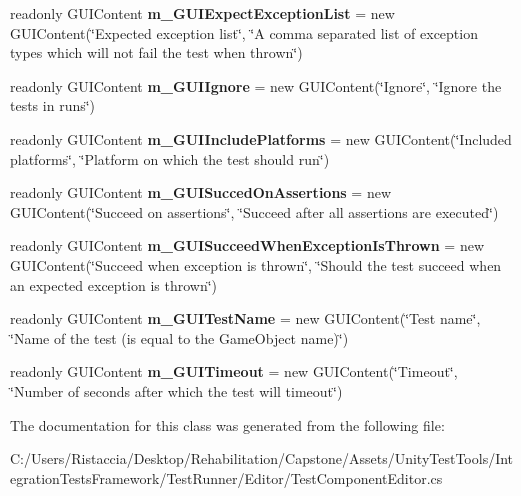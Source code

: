 \begin{DoxyCompactItemize}
readonly G\+U\+I\+Content {\bfseries m\+\_\+\+G\+U\+I\+Expect\+Exception\+List} = new G\+U\+I\+Content(\char`\"{}Expected exception list\char`\"{}, \char`\"{}A comma separated list of exception types which will not fail the test when thrown\char`\"{})
\item 
\mbox{\label{class_unity_test_1_1_test_component_editor_a491ac34f5ba2300e6ec15e26425969a0}} 
readonly G\+U\+I\+Content {\bfseries m\+\_\+\+G\+U\+I\+Ignore} = new G\+U\+I\+Content(\char`\"{}Ignore\char`\"{}, \char`\"{}Ignore the tests in runs\char`\"{})
\item 
\mbox{\label{class_unity_test_1_1_test_component_editor_acf6cb71d05de085b8d24bdcb6ae945e5}} 
readonly G\+U\+I\+Content {\bfseries m\+\_\+\+G\+U\+I\+Include\+Platforms} = new G\+U\+I\+Content(\char`\"{}Included platforms\char`\"{}, \char`\"{}Platform on which the test should run\char`\"{})
\item 
\mbox{\label{class_unity_test_1_1_test_component_editor_a0f4eef4ce52929808813ed35e033abdf}} 
readonly G\+U\+I\+Content {\bfseries m\+\_\+\+G\+U\+I\+Succed\+On\+Assertions} = new G\+U\+I\+Content(\char`\"{}Succeed on assertions\char`\"{}, \char`\"{}Succeed after all assertions are executed\char`\"{})
\item 
\mbox{\label{class_unity_test_1_1_test_component_editor_ad49a950f9613496e1433d6ade680a653}} 
readonly G\+U\+I\+Content {\bfseries m\+\_\+\+G\+U\+I\+Succeed\+When\+Exception\+Is\+Thrown} = new G\+U\+I\+Content(\char`\"{}Succeed when exception is thrown\char`\"{}, \char`\"{}Should the test succeed when an expected exception is thrown\char`\"{})
\item 
\mbox{\label{class_unity_test_1_1_test_component_editor_a104fc9e7ee26d33e6b4925aa2eb77863}} 
readonly G\+U\+I\+Content {\bfseries m\+\_\+\+G\+U\+I\+Test\+Name} = new G\+U\+I\+Content(\char`\"{}Test name\char`\"{}, \char`\"{}Name of the test (is equal to the Game\+Object name)\char`\"{})
\item 
\mbox{\label{class_unity_test_1_1_test_component_editor_ac19005c1bdfb9a495f02bcb16dcc225d}} 
readonly G\+U\+I\+Content {\bfseries m\+\_\+\+G\+U\+I\+Timeout} = new G\+U\+I\+Content(\char`\"{}Timeout\char`\"{}, \char`\"{}Number of seconds after which the test will timeout\char`\"{})
\end{DoxyCompactItemize}


The documentation for this class was generated from the following file\+:\begin{DoxyCompactItemize}
\item 
C\+:/\+Users/\+Ristaccia/\+Desktop/\+Rehabilitation/\+Capstone/\+Assets/\+Unity\+Test\+Tools/\+Integration\+Tests\+Framework/\+Test\+Runner/\+Editor/Test\+Component\+Editor.\+cs\end{DoxyCompactItemize}
